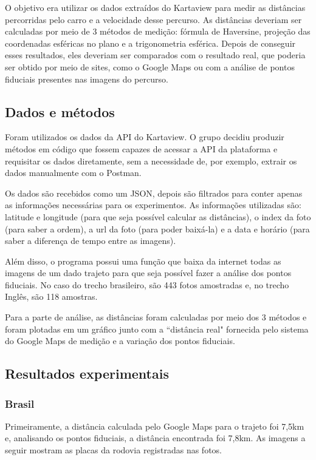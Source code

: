 \documentclass{article}
\begin{document}
\qquad O objetivo era utilizar os dados extraídos do Kartaview para medir as distâncias percorridas pelo carro e a velocidade desse percurso. As distâncias deveriam ser calculadas por meio de 3 métodos de medição: fórmula de Haversine, projeção das coordenadas esféricas no plano e a trigonometria esférica. Depois de conseguir esses resultados, eles deveriam ser comparados com o resultado real, que poderia ser obtido por meio de sites, como o Google Maps ou com a análise de pontos fiduciais presentes nas imagens do percurso.

\subsection{Dados e métodos}

\qquad Foram utilizados os dados da API do Kartaview. O grupo decidiu produzir métodos em código que fossem capazes de acessar a API da plataforma e requisitar os dados diretamente, sem a necessidade de, por exemplo, extrair os dados manualmente com o Postman.

\quad Os dados são recebidos como um JSON, depois são filtrados para conter apenas as informações necessárias para os experimentos. As informações utilizadas são: latitude e longitude (para que seja possível calcular as distâncias), o index da foto (para saber a ordem), a url da foto (para poder baixá-la) e a data e horário (para saber a diferença de tempo entre as imagens).

\quad Além disso, o programa possui uma função que baixa da internet todas as imagens de um dado trajeto para que seja possível fazer a análise dos pontos fiduciais. No caso do trecho brasileiro, são 443 fotos amostradas e, no trecho Inglês, são 118 amostras.

\quad Para a parte de análise, as distâncias foram calculadas por meio dos 3 métodos e foram plotadas em um gráfico junto com a ``distância real" fornecida pelo sistema do Google Maps de medição e a variação dos pontos fiduciais.

\subsection{Resultados experimentais}

\subsubsection{Brasil}

\qquad Primeiramente, a distância calculada pelo Google Maps para o trajeto foi 7,5km e, analisando os pontos fiduciais, a distância encontrada foi 7,8km. As imagens a seguir mostram as placas da rodovia registradas nas fotos.
\end{document}
